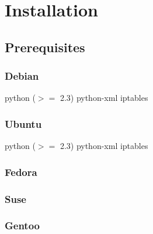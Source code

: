 \chapter{Installation}

\section{Prerequisites}

\subsection{Debian}

python ($>=$ 2.3)\newline
python-xml\newline
iptables\newline

\subsection{Ubuntu}

python ($>=$ 2.3)\newline
python-xml\newline
iptables\newline

\subsection{Fedora}

\subsection{Suse}

\subsection{Gentoo}

